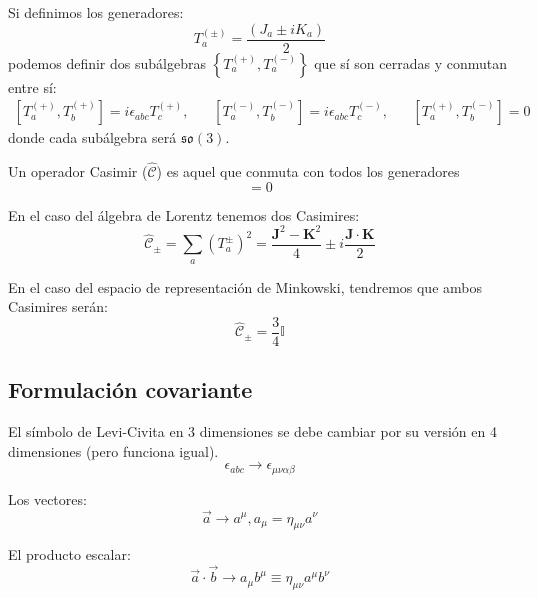 \documentclass[]{report}
\numberwithin{equation}{section}
\newcommand{\0}{\textcolor{gray}{0}}
\begin{document}
Si definimos los generadores:
\begin{equation}
	T^{(\pm)}_a = \frac{(J_a \pm iK_a)}{2}
\end{equation}
podemos definir dos subálgebras \(\left\lbrace T^{(+)}_a,T^{(-)}_a\right\rbrace\) que sí son cerradas y conmutan entre sí:
\begin{equation}
	\begin{matrix}
		[T^{(+)}_a,T^{(+)}_b] = i\epsilon_{abc}T^{(+)}_c,\ \ \ \ & [T^{(-)}_a,T^{(-)}_b] = i\epsilon_{abc}T^{(-)}_c,\ \ \ \ & [T^{(+)}_a,T^{(-)}_b] = 0
	\end{matrix}
\end{equation}
donde cada subálgebra será \(\mathfrak{so}(3)\).

Un operador Casimir (\(\mathcal{\hat{C}}\)) es aquel que conmuta con todos los generadores
\begin{equation}
	[T_a,\mathcal{\hat{C}}] = 0
\end{equation}

En el caso del álgebra de Lorentz tenemos dos Casimires:
\begin{equation}
	\mathcal{\hat{C}}_{\pm} = \sum_{a}(T_a^{\pm})^2 = \frac{\mathbf{J}^2-\mathbf{K}^2}{4} \pm i\frac{\mathbf{J}\cdot\mathbf{K}}{2}
\end{equation}

En el caso del espacio de representación de Minkowski, tendremos que ambos Casimires serán:
\begin{equation}
	\mathcal{\hat{C}}_{\pm} = \frac{3}{4}\mathbb{I}
\end{equation}

\subsection{Formulación covariante}

El símbolo de Levi-Civita en 3 dimensiones  se debe cambiar por su versión en 4 dimensiones (pero funciona igual).
\begin{equation}
	\epsilon_{abc} \rightarrow \epsilon_{\mu\nu\alpha\beta}
\end{equation}

Los vectores:
\begin{equation}
	\vec{a} \rightarrow a^\mu, a_\mu = \eta_{\mu\nu}a^\nu
\end{equation}

El producto escalar:
\begin{equation}
	\vec{a}\cdot\vec{b} \rightarrow a_\mu b^\mu \equiv \eta_{\mu\nu}a^\mu b^\nu
\end{equation}
\end{document}
